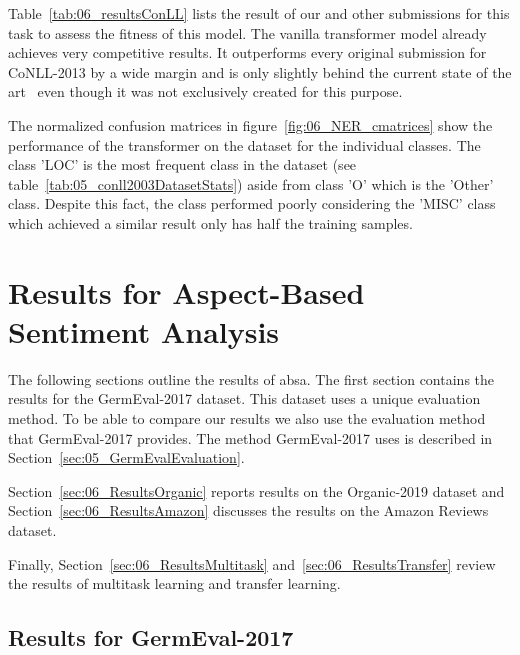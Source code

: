 \bigskip
Table~\ref{tab:06_resultsConLL} lists the result of our and other submissions for this task to assess the fitness of this model. The vanilla transformer model already achieves very competitive results. It outperforms every original submission for CoNLL-2013 by a wide margin and is only slightly behind the current state of the art~\cite{Baevski2019} even though it was not exclusively created for this purpose.
\medskip



The normalized confusion matrices in figure~\ref{fig:06_NER_cmatrices} show the performance of the transformer on the dataset for the individual classes. The class 'LOC' is the most frequent class in the dataset {(see table~\ref{tab:05_conll2003DatasetStats})} aside from class 'O' which is the 'Other' class. Despite this fact, the class performed poorly considering the 'MISC' class which achieved a similar result only has half the training samples.



\section{Results for Aspect-Based Sentiment Analysis}
The following sections outline the results of \acrfull{absa}. The first section contains the results for the GermEval-2017 dataset. This dataset uses a unique evaluation method. To be able to compare our results we also use the evaluation method that GermEval-2017 provides.
The method GermEval-2017 uses is described in Section~\ref{sec:05_GermEvalEvaluation}.
\medskip

Section~\ref{sec:06_ResultsOrganic} reports results on the Organic-2019 dataset and Section~\ref{sec:06_ResultsAmazon} discusses the results on the Amazon Reviews dataset.

Finally, Section~\ref{sec:06_ResultsMultitask} and~\ref{sec:06_ResultsTransfer} review the results of multitask learning and transfer learning.

\subsection{Results for GermEval-2017}
\label{sec:06_ResultsGermEval}

